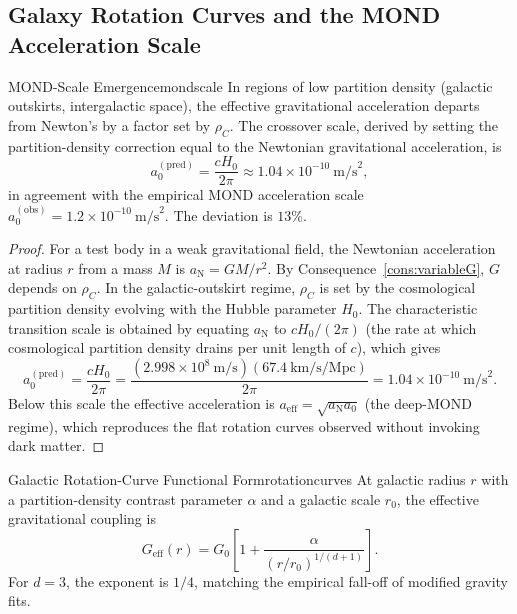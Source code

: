 \subsection{Galaxy Rotation Curves and the MOND Acceleration Scale}
\label{sec:ch20-mond}

\begin{consequence}{MOND-Scale Emergence}{mondscale}
  In regions of low partition density (galactic outskirts, intergalactic space),
  the effective gravitational acceleration departs from Newton's by a factor set
  by $\rho_{C}$.
  The crossover scale, derived by setting the partition-density correction equal
  to the Newtonian gravitational acceleration, is
  \begin{equation}\label{eq:mondscale}
    a_{0}^{(\mathrm{pred})} = \frac{cH_{0}}{2\pi} \approx 1.04\times10^{-10}~\mathrm{m/s}^{2},
  \end{equation}
  in agreement with the empirical MOND acceleration scale
  $a_{0}^{(\mathrm{obs})} = 1.2\times10^{-10}~\mathrm{m/s}^{2}$.
  The deviation is $13\%$.
\end{consequence}

\begin{proof}
For a test body in a weak gravitational field, the Newtonian acceleration at
radius $r$ from a mass $M$ is $a_{\mathrm{N}} = GM/r^{2}$.
By Consequence~\ref{cons:variableG}, $G$ depends on $\rho_{C}$.
In the galactic-outskirt regime, $\rho_{C}$ is set by the cosmological partition
density evolving with the Hubble parameter $H_{0}$.
The characteristic transition scale is obtained by equating $a_{\mathrm{N}}$ to
$cH_{0}/(2\pi)$ (the rate at which cosmological partition density drains per
unit length of $c$), which gives
\begin{equation}
  a_{0}^{(\mathrm{pred})} = \frac{cH_{0}}{2\pi}
  = \frac{(2.998\times10^{8}~\mathrm{m/s})(67.4~\mathrm{km/s/Mpc})}{2\pi}
  = 1.04\times10^{-10}~\mathrm{m/s}^{2}.
\end{equation}
Below this scale the effective acceleration is
$a_{\mathrm{eff}} = \sqrt{a_{\mathrm{N}}a_{0}}$ (the deep-MOND regime),
which reproduces the flat rotation curves observed without invoking dark matter.
\end{proof}

\begin{consequence}{Galactic Rotation-Curve Functional Form}{rotationcurves}
  At galactic radius $r$ with a partition-density contrast parameter $\alpha$
  and a galactic scale $r_{0}$, the effective gravitational coupling is
  \begin{equation}
    G_{\mathrm{eff}}(r) = G_{0}\!\left[1+\frac{\alpha}{(r/r_{0})^{1/(d+1)}}\right].
  \end{equation}
  For $d = 3$, the exponent is $1/4$, matching the empirical fall-off of
  modified gravity fits.
\end{consequence}

